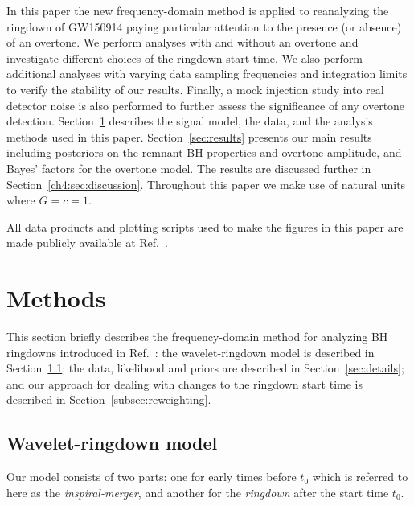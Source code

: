 In this paper the new frequency-domain method is applied to reanalyzing the ringdown of GW150914 paying particular attention to the presence (or absence) of an overtone. 
We perform analyses with and without an overtone and investigate different choices of the ringdown start time. 
We also perform additional analyses with varying data sampling frequencies and integration limits to verify the stability of our results. Finally, a mock injection study into real detector noise is also performed to further assess the significance of any overtone detection.
Section~\ref{sec:analysis} describes the signal model, the data, and the analysis methods used in this paper.
Section~\ref{sec:results} presents our main results including posteriors on the remnant BH properties and overtone amplitude, and Bayes' factors for the overtone model.
The results are discussed further in Section~\ref{ch4:sec:discussion}.
Throughout this paper we make use of natural units where $G=c=1$.

All data products and plotting scripts used to make the figures in this paper are made publicly available at Ref.~\cite{finch_eliot_2022_6949492}.


\section{Methods}\label{sec:analysis}

This section briefly describes the frequency-domain method for analyzing BH ringdowns introduced in Ref.~\cite{Finch:2021qph}:
the wavelet-ringdown model is described in Section~\ref{sec:model}; the data, likelihood and priors are described in Section~\ref{sec:details}; and our approach for dealing with changes to the ringdown start time is described in Section~\ref{subsec:reweighting}.


\subsection{Wavelet-ringdown model}\label{sec:model}

Our model consists of two parts: one for early times before $t_0$ which is referred to here as the \emph{inspiral-merger}, and another for the \emph{ringdown} after the start time $t_0$.

